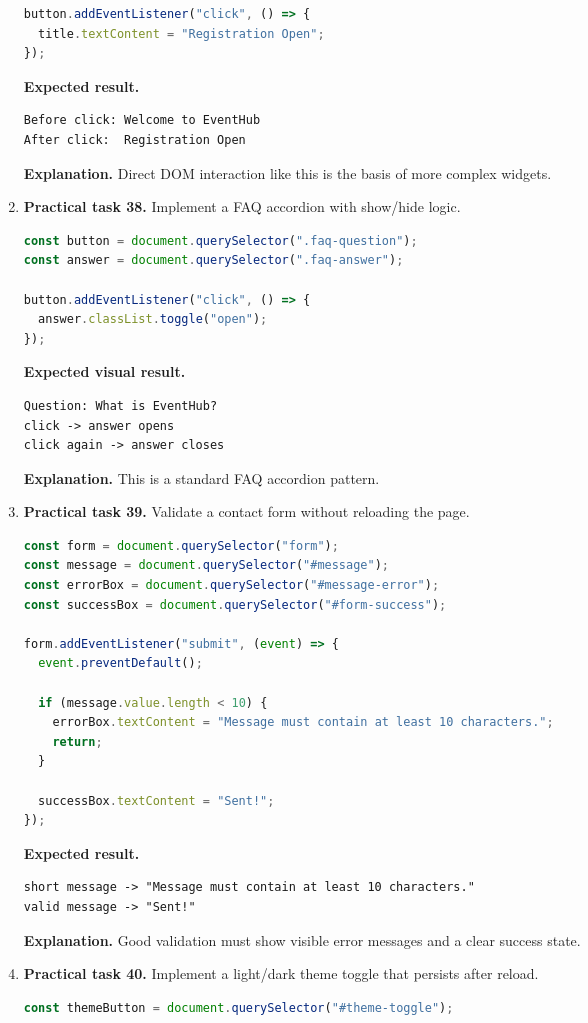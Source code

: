 \documentclass[11pt,a4paper]{article}
\begin{document}
\begin{enumerate}
\begin{lstlisting}[style=code, language=JavaScript]
button.addEventListener("click", () => {
  title.textContent = "Registration Open";
});
\end{lstlisting}
\textbf{Expected result.}
\begin{lstlisting}[style=terminal]
Before click: Welcome to EventHub
After click:  Registration Open
\end{lstlisting}
\textbf{Explanation.} Direct DOM interaction like this is the basis of more complex widgets.

  \item \textbf{Practical task 38.} Implement a FAQ accordion with show/hide logic.
\begin{lstlisting}[style=code, language=JavaScript]
const button = document.querySelector(".faq-question");
const answer = document.querySelector(".faq-answer");

button.addEventListener("click", () => {
  answer.classList.toggle("open");
});
\end{lstlisting}
\textbf{Expected visual result.}
\begin{lstlisting}[style=terminal]
Question: What is EventHub?
click -> answer opens
click again -> answer closes
\end{lstlisting}
\textbf{Explanation.} This is a standard FAQ accordion pattern.

  \item \textbf{Practical task 39.} Validate a contact form without reloading the page.
\begin{lstlisting}[style=code, language=JavaScript]
const form = document.querySelector("form");
const message = document.querySelector("#message");
const errorBox = document.querySelector("#message-error");
const successBox = document.querySelector("#form-success");

form.addEventListener("submit", (event) => {
  event.preventDefault();

  if (message.value.length < 10) {
    errorBox.textContent = "Message must contain at least 10 characters.";
    return;
  }

  successBox.textContent = "Sent!";
});
\end{lstlisting}
\textbf{Expected result.}
\begin{lstlisting}[style=terminal]
short message -> "Message must contain at least 10 characters."
valid message -> "Sent!"
\end{lstlisting}
\textbf{Explanation.} Good validation must show visible error messages and a clear success state.

  \item \textbf{Practical task 40.} Implement a light/dark theme toggle that persists after reload.
\begin{lstlisting}[style=code, language=JavaScript]
const themeButton = document.querySelector("#theme-toggle");


\end{lstlisting}
\end{enumerate}
\end{document}
